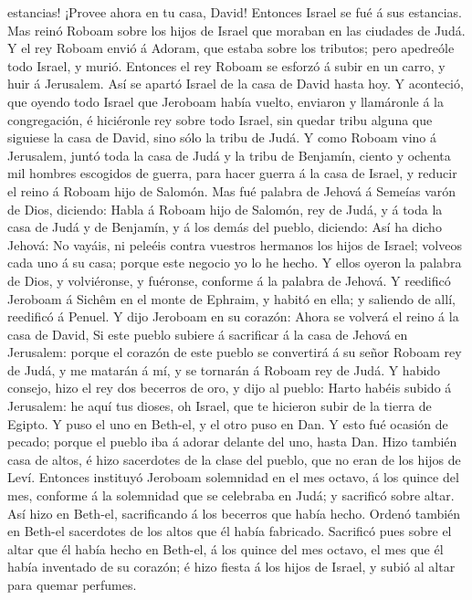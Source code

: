 estancias! ¡Provee ahora en tu casa, David! Entonces Israel se fué á sus
estancias.  Mas reinó Roboam sobre los hijos de Israel
que moraban en las ciudades de Judá.  Y el rey Roboam
envió á Adoram, que estaba sobre los tributos; pero apedreóle todo
Israel, y murió. Entonces el rey Roboam se esforzó á subir en un carro,
y huir á Jerusalem.  Así se apartó Israel de la casa de
David hasta hoy.  Y aconteció, que oyendo todo Israel que
Jeroboam había vuelto, enviaron y llamáronle á la congregación, é
hiciéronle rey sobre todo Israel, sin quedar tribu alguna que siguiese
la casa de David, sino sólo la tribu de Judá.  Y como
Roboam vino á Jerusalem, juntó toda la casa de Judá y la tribu de
Benjamín, ciento y ochenta mil hombres escogidos de guerra, para hacer
guerra á la casa de Israel, y reducir el reino á Roboam hijo de Salomón.
 Mas fué palabra de Jehová á Semeías varón de Dios,
diciendo:  Habla á Roboam hijo de Salomón, rey de Judá, y
á toda la casa de Judá y de Benjamín, y á los demás del pueblo,
diciendo:  Así ha dicho Jehová: No vayáis, ni peleéis
contra vuestros hermanos los hijos de Israel; volveos cada uno á su
casa; porque este negocio yo lo he hecho. Y ellos oyeron la palabra de
Dios, y volviéronse, y fuéronse, conforme á la palabra de Jehová.
 Y reedificó Jeroboam á Sichêm en el monte de Ephraim, y
habitó en ella; y saliendo de allí, reedificó á Penuel. 
Y dijo Jeroboam en su corazón: Ahora se volverá el reino á la casa de
David,  Si este pueblo subiere á sacrificar á la casa de
Jehová en Jerusalem: porque el corazón de este pueblo se convertirá á su
señor Roboam rey de Judá, y me matarán á mí, y se tornarán á Roboam rey
de Judá.  Y habido consejo, hizo el rey dos becerros de
oro, y dijo al pueblo: Harto habéis subido á Jerusalem: he aquí tus
dioses, oh Israel, que te hicieron subir de la tierra de Egipto.
 Y puso el uno en Beth-el, y el otro puso en Dan.
 Y esto fué ocasión de pecado; porque el pueblo iba á
adorar delante del uno, hasta Dan.  Hizo también casa de
altos, é hizo sacerdotes de la clase del pueblo, que no eran de los
hijos de Leví.  Entonces instituyó Jeroboam solemnidad en
el mes octavo, á los quince del mes, conforme á la solemnidad que se
celebraba en Judá; y sacrificó sobre altar. Así hizo en Beth-el,
sacrificando á los becerros que había hecho. Ordenó también en Beth-el
sacerdotes de los altos que él había fabricado. 
Sacrificó pues sobre el altar que él había hecho en Beth-el, á los
quince del mes octavo, el mes que él había inventado de su corazón; é
hizo fiesta á los hijos de Israel, y subió al altar para quemar
perfumes.

